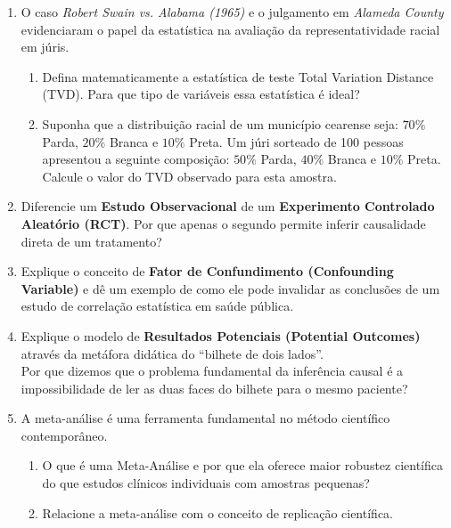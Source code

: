 \documentclass[12pt]{article}
\begin{document}
\begin{enumerate}[label=\textbf{Questão \arabic*}]
    \item O caso \textit{Robert Swain vs. Alabama (1965)} e o julgamento em \textit{Alameda County} evidenciaram o papel da estatística na avaliação da representatividade racial em júris.
    \begin{enumerate}[label=\alph*)]
        \item Defina matematicamente a estatística de teste Total Variation Distance (TVD). Para que tipo de variáveis essa estatística é ideal?
        \item Suponha que a distribuição racial de um município cearense seja: $70\%$ Parda, $20\%$ Branca e $10\%$ Preta. Um júri sorteado de 100 pessoas apresentou a seguinte composição: $50\%$ Parda, $40\%$ Branca e $10\%$ Preta. Calcule o valor do TVD observado para esta amostra.
    \end{enumerate}

    \item Diferencie um \textbf{Estudo Observacional} de um \textbf{Experimento Controlado Aleatório (RCT)}. Por que apenas o segundo permite inferir causalidade direta de um tratamento?

    \item Explique o conceito de \textbf{Fator de Confundimento (Confounding Variable)} e dê um exemplo de como ele pode invalidar as conclusões de um estudo de correlação estatística em saúde pública.

    \item Explique o modelo de \textbf{Resultados Potenciais (Potential Outcomes)} através da metáfora didática do ``bilhete de dois lados''. \\
    Por que dizemos que o problema fundamental da inferência causal é a impossibilidade de ler as duas faces do bilhete para o mesmo paciente?

    \item A meta-análise é uma ferramenta fundamental no método científico contemporâneo.
    \begin{enumerate}[label=\alph*)]
        \item O que é uma Meta-Análise e por que ela oferece maior robustez científica do que estudos clínicos individuais com amostras pequenas?
        \item Relacione a meta-análise com o conceito de replicação científica.
    \end{enumerate}


\end{enumerate}
\end{document}
